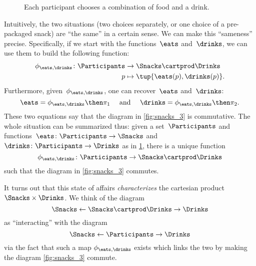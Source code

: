 \begin{figure}[h!]
    \centering
    \caption{Each participant chooses a combination of food and a drink. \label{fig:snacks_2}}
\end{figure}

Intuitively, the two situations (two choices separately, or one choice of a pre-packaged snack) are ``the same'' in a certain sense.
We can make this ``sameness'' precise.
Specifically, if we start with the functions~$\eats$ and~$\drinks$, we can use them to build the following function:
\begin{equation}
    \label{eq:snacks-building-univ-map}
    \begin{aligned}
        \phi_{\eats,\drinks}\colon \Participants & \to \Snacks\cartprod \Drinks       \\
        p                                        & \mapsto \tup{\eats(p),\drinks(p)}.
    \end{aligned}
\end{equation}
Furthermore, given~$\phi_{\eats,\drinks}$, one can recover~$\eats$ and~$\drinks$:
\begin{equation}
    \label{eq:snacks-proj-univ-map}
    \eats =\phi_{\eats,\drinks}\then \pi_1 \quad  \text{ and } \quad \drinks=\phi_{\eats,\drinks}\then \pi_2.
\end{equation}
These two equations say that the diagram in \cref{fig:snacks_3} is commutative.
The whole situation can be summarized thus: given a set~$\Participants$ and functions~$\eats\colon \Participants \to \Snacks$ and~$\drinks\colon \Participants \to \Drinks$ as in \cref{fig:snacks_2}, there is a unique function~
\begin{equation}
    \label{eq:snacks-unique-univ-map}
    \phi_{\eats,\drinks} \colon \Participants \to \Snacks \cartprod \Drinks
\end{equation}
such that the diagram in \cref{fig:snacks_3} commutes.

\begin{figure*}[h!]
    \centering
    \caption{Choosing food and drink separately is essentially the same as choosing a combination of the two. }
    \label{fig:snacks_3}
\end{figure*}

It turns out that this state of affairs \emph{characterizes} the cartesian product $\Snacks\times \Drinks$.
We think of the diagram
\begin{equation}
    \label{eq:snacks-prod-diagram}
    \Snacks \leftarrow \Snacks \cartprod \Drinks \rightarrow \Drinks
\end{equation}
as ``interacting'' with the diagram
\begin{equation}
    \label{eq:snacks-prod-test-diagram}
    \Snacks \leftarrow \Participants \rightarrow \Drinks
\end{equation}
via the fact that such a map $\phi_{\eats,\drinks}$ exists which links the two by making the diagram \cref{fig:snacks_3} commute.

